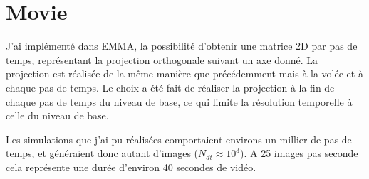 %
%
%
%
%
%
%
%




\section{Movie}

J'ai implémenté dans EMMA, la possibilité d'obtenir une matrice 2D par pas de temps, représentant la projection orthogonale suivant un axe donné.
La projection est réalisée de la même manière que précédemment mais à la volée et à chaque pas de temps.
Le choix a été fait de réaliser la projection à la fin de chaque pas de temps du niveau de base, ce qui limite la résolution temporelle à celle du niveau de base.


Les simulations que j'ai pu réalisées comportaient environs un millier de pas de temps, et généraient donc autant d'images ($N_{dt} \approx 10^3$).
A 25 images pas seconde cela représente une durée d'environ 40 secondes de vidéo.

